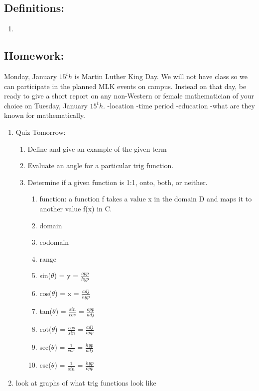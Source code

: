 \documentclass[12pt]{article}
\begin{document}
\subsection{Definitions: }
\begin{enumerate}
    \item 
\end{enumerate}
\subsection{Homework: }
\item Monday, January \(15^th\) is Martin Luther King Day. We will not have class so we can participate in the planned MLK events on campus. Instead on that day, be ready to give a short report on any non-Western or female mathematician of your choice on Tuesday, January \(15^th\). -location -time period -education -what are they known for mathematically.
\begin{enumerate}
    \item Quiz Tomorrow:
    \begin{enumerate}
        \item Define and give an example of the given term
        \item Evaluate an angle for a particular trig function.
        \item Determine if a given function is 1:1, onto, both, or neither.
        \begin{enumerate}
            \item function: a function f takes a value x in the domain D and maps it to another value f(x) in C.
            \item domain
            \item codomain
            \item range
            \item sin(\(\theta\)) = y = \(\frac{opp}{hyp}\)
            \item cos(\(\theta\)) = x = \(\frac{adj}{hyp}\)
            \item tan(\(\theta\)) = \(\frac{sin}{cos}\) = \(\frac{opp}{adj}\)
            \item cot(\(\theta\)) = \(\frac{cos}{sin}\) = \(\frac{adj}{opp}\)
            \item sec(\(\theta\)) = \(\frac{1}{cos}\) = \(\frac{hyp}{adj}\)
            \item csc(\(\theta\)) = \(\frac{1}{sin}\) = \(\frac{hyp}{opp}\)
        \end{enumerate}
    \end{enumerate}
    \item look at graphs of what trig functions look like
\end{enumerate}
\end{document}
